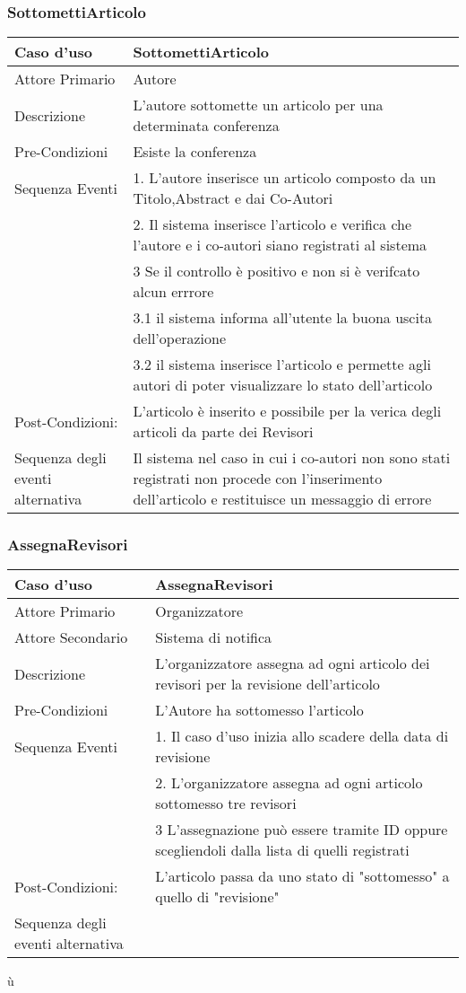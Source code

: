 \subsubsection{SottomettiArticolo}
\begin{tabular}{|p{1cm}|p{10cm}}
\hline 
\rowcolor{Skyblue}
Caso d'uso & SottomettiArticolo \\
\hline
Attore Primario & Autore\\
\hline
Descrizione & L'autore sottomette un articolo per una determinata conferenza\\
\hline
Pre-Condizioni& Esiste la conferenza\\
\hline
Sequenza Eventi&1.  L'autore inserisce un articolo composto da un Titolo,Abstract e dai Co-Autori\\
& 2. Il sistema inserisce l'articolo e verifica che l'autore e i co-autori siano registrati al sistema \\ 
&3 Se il controllo è positivo e non si è verifcato alcun errrore\\
&3.1 il sistema informa all'utente la buona uscita dell'operazione\\
&3.2 il sistema inserisce l'articolo e permette agli autori di poter visualizzare lo stato dell'articolo\\
\hline
Post-Condizioni: &L'articolo è inserito e possibile per la verica degli articoli da parte dei Revisori\\
\hline
Sequenza degli eventi alternativa & Il sistema nel caso in cui i co-autori non sono stati registrati non procede con l'inserimento dell'articolo e restituisce un messaggio di errore\\
\hline
\end{tabular}

\subsubsection{AssegnaRevisori}
\begin{tabular}{|p{1cm}|p{10cm}}
\hline 
\rowcolor{Skyblue}
Caso d'uso & AssegnaRevisori \\
\hline
Attore Primario & Organizzatore\\
\hline
Attore Secondario & Sistema di notifica\\
\hline
Descrizione &L'organizzatore  assegna ad ogni articolo dei revisori per la revisione dell'articolo\\
\hline
Pre-Condizioni& L'Autore ha sottomesso l'articolo\\
\hline
Sequenza Eventi&1.  Il caso d'uso inizia allo scadere della data di revisione\\
&2. L'organizzatore assegna ad ogni articolo sottomesso tre revisori\\
&3 L'assegnazione può essere tramite ID oppure scegliendoli dalla lista di quelli registrati\\
\hline
Post-Condizioni: &L'articolo passa da uno stato di "sottomesso" a quello di "revisione" \\
\hline
Sequenza degli eventi alternativa \\
\hline
\end{tabular}ù

